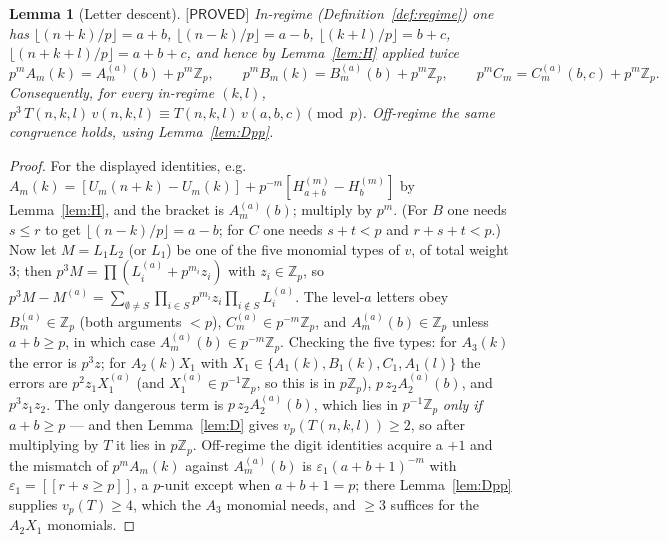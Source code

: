 \documentclass[11pt,reqno]{amsart}
\theoremstyle{plain}
\newtheorem{lemma}[theorem]{Lemma}
\theoremstyle{definition}
\theoremstyle{remark}
\numberwithin{equation}{section}
\newcommand{\ZZ}{\mathbb{Z}}
\newcommand{\Zp}{\ZZ_p}
\newcommand{\ii}[1]{[\![#1]\!]}
\newcommand{\PROVED}{\textsf{[PROVED]}}
\begin{document}
\begin{lemma}[Letter descent]\label{lem:G}
$\PROVED$ In-regime (Definition~\ref{def:regime}) one has
$\lfloor(n+k)/p\rfloor=a+b$, $\lfloor(n-k)/p\rfloor=a-b$, $\lfloor(k+l)/p\rfloor=b+c$,
$\lfloor(n+k+l)/p\rfloor=a+b+c$, and hence by Lemma~\ref{lem:H} applied twice
\[
p^mA_m(k)=A^{(a)}_m(b)+p^m\Zp,\qquad p^mB_m(k)=B^{(a)}_m(b)+p^m\Zp,\qquad
p^mC_m=C^{(a)}_m(b,c)+p^m\Zp .
\]
Consequently, for every in-regime $(k,l)$,
$p^3\,T(n,k,l)\,v(n,k,l)\equiv T(n,k,l)\,v(a,b,c)\pmod p$. Off-regime the same congruence holds,
using Lemma~\textup{\ref{lem:Dpp}}.
\end{lemma}

\begin{proof}
For the displayed identities, e.g.\
$A_m(k)=[U_m(n+k)-U_m(k)]+p^{-m}[H^{(m)}_{a+b}-H^{(m)}_b]$ by Lemma~\ref{lem:H}, and the
bracket is $A^{(a)}_m(b)$; multiply by $p^m$. (For $B$ one needs $s\le r$ to get
$\lfloor(n-k)/p\rfloor=a-b$; for $C$ one needs $s+t<p$ and $r+s+t<p$.)
Now let $M=L_1L_2$ (or $L_1$) be one of the five monomial types of $v$, of total weight $3$;
then $p^3M=\prod(L_i^{(a)}+p^{m_i}z_i)$ with $z_i\in\Zp$, so
$p^3M-M^{(a)}=\sum_{\emptyset\ne S}\prod_{i\in S}p^{m_i}z_i\prod_{i\notin S}L_i^{(a)}$. The
level-$a$ letters obey $B^{(a)}_m\in\Zp$ (both arguments $<p$), $C^{(a)}_m\in p^{-m}\Zp$, and
$A^{(a)}_m(b)\in\Zp$ unless $a+b\ge p$, in which case $A^{(a)}_m(b)\in p^{-m}\Zp$. Checking the
five types: for $A_3(k)$ the error is $p^3z$; for $A_2(k)X_1$ with
$X_1\in\{A_1(k),B_1(k),C_1,A_1(l)\}$ the errors are $p^2z_1X_1^{(a)}$ (and
$X_1^{(a)}\in p^{-1}\Zp$, so this is in $p\Zp$), $p\,z_2A^{(a)}_2(b)$, and $p^3z_1z_2$. The only
dangerous term is $p\,z_2A^{(a)}_2(b)$, which lies in $p^{-1}\Zp$ \emph{only if} $a+b\ge p$ ---
and then Lemma~\ref{lem:D} gives $v_p(T(n,k,l))\ge2$, so after multiplying by $T$ it lies in
$p\Zp$. Off-regime the digit identities acquire a $+1$ and the mismatch of $p^mA_m(k)$ against
$A^{(a)}_m(b)$ is $\varepsilon_1(a+b+1)^{-m}$ with $\varepsilon_1=\ii{r+s\ge p}$, a $p$-unit
except when $a+b+1=p$; there Lemma~\ref{lem:Dpp} supplies $v_p(T)\ge4$, which the $A_3$
monomial needs, and $\ge3$ suffices for the $A_2X_1$ monomials.
\end{proof}
\end{document}
